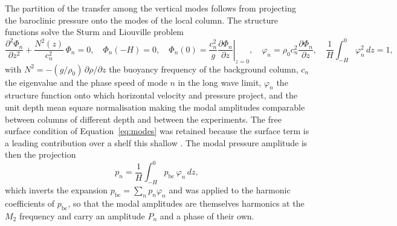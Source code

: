 \documentclass[a4paper,fleqn]{cas-sc}
\newcommand{\bc}{\mathrm{bc}}
\begin{document}
The partition of the transfer among the vertical modes follows from projecting the baroclinic pressure onto the modes of the local column. The structure functions solve the Sturm and Liouville problem
\begin{equation}
\frac{\partial^{2}\Phi_{n}}{\partial z^{2}}+\frac{N^{2}(z)}{c_{n}^{2}}\,\Phi_{n}=0 ,
\quad
\Phi_{n}(-H)=0 ,
\quad
\Phi_{n}(0)=\frac{c_{n}^{2}}{g}\left.\frac{\partial\Phi_{n}}{\partial z}\right|_{z=0} ,
\quad
\varphi_{n}=\rho_{0}c_{n}^{2}\frac{\partial\Phi_{n}}{\partial z} ,
\quad
\frac{1}{H}\int_{-H}^{0}\varphi_{n}^{2}\,dz=1 ,
\label{eq:modes}
\end{equation}
with $N^{2}=-(g/\rho_{0})\,\partial\rho/\partial z$ the buoyancy frequency of the background column, $c_{n}$ the eigenvalue and the phase speed of mode $n$ in the long wave limit, $\varphi_{n}$ the structure function onto which horizontal velocity and pressure project, and the unit depth mean square normalisation making the modal amplitudes comparable between columns of different depth and between the experiments. The free surface condition of Equation~\ref{eq:modes} was retained because the surface term is a leading contribution over a shelf this shallow \citep{tchilibou:2022,kelly:2016b}. The modal pressure amplitude is then the projection
\begin{equation}
p_{n}=\frac{1}{H}\int_{-H}^{0}p_{\bc}\,\varphi_{n}\,dz ,
\label{eq:projection}
\end{equation}
which inverts the expansion $p_{\bc}=\sum_{n}p_{n}\varphi_{n}$ and was applied to the harmonic coefficients of $p_{\bc}$, so that the modal amplitudes are themselves harmonics at the $M_{2}$ frequency and carry an amplitude $P_{n}$ and a phase of their own.
\end{document}
